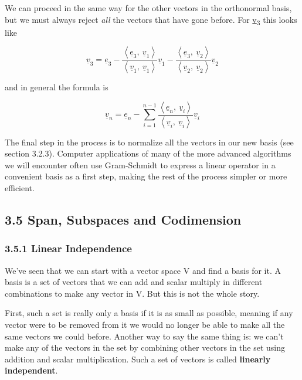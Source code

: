\documentclass[oneside,english]{amsbook}
\numberwithin{section}{chapter}
\theoremstyle{plain}
\theoremstyle{definition}
\begin{document}
We can proceed in the same way for the other vectors in the orthonormal
basis, but we must always reject \emph{all} the vectors that have gone
before. For \ul{v}\textsubscript{3} this looks like

\[{\underline{v}}_{3} = {\underline{e}}_{3} - \frac{\left\langle {\underline{e}}_{3},\ {\underline{v}}_{1} \right\rangle}{\left\langle {\underline{v}}_{1},\ {\underline{v}}_{1} \right\rangle}{\underline{v}}_{1} - \frac{\left\langle {\underline{e}}_{3},\ {\underline{v}}_{2} \right\rangle}{\left\langle {\underline{v}}_{2},\ {\underline{v}}_{2} \right\rangle}{\underline{v}}_{2}\]

and in general the formula is

\[{\underline{v}}_{n} = {\underline{e}}_{n} - \sum_{i = 1}^{n - 1}{\frac{\left\langle {\underline{e}}_{n},\ {\underline{v}}_{i} \right\rangle}{\left\langle {\underline{v}}_{i},\ {\underline{v}}_{i} \right\rangle}{\underline{v}}_{i}}\]

The final step in the process is to normalize all the vectors in our new
basis (see section 3.2.3). Computer applications of many of the more
advanced algorithms we will encounter often use Gram-Schmidt to express
a linear operator in a convenient basis as a first step, making the rest
of the process simpler or more efficient.

\subsection{3.5 Span, Subspaces and
	Codimension}\label{span-subspaces-and-codimension}

\subsubsection{3.5.1 Linear Independence}\label{linear-independence}

We've seen that we can start with a vector space V and find a basis for
it. A basis is a set of vectors that we can add and scalar multiply in
different combinations to make any vector in V. But this is not the
whole story.

First, such a set is really only a basis if it is as small as possible,
meaning if any vector were to be removed from it we would no longer be
able to make all the same vectors we could before. Another way to say
the same thing is: we can't make any of the vectors in the set by
combining other vectors in the set using addition and scalar
multiplication. Such a set of vectors is called \textbf{linearly
	independent}.
\end{document}
